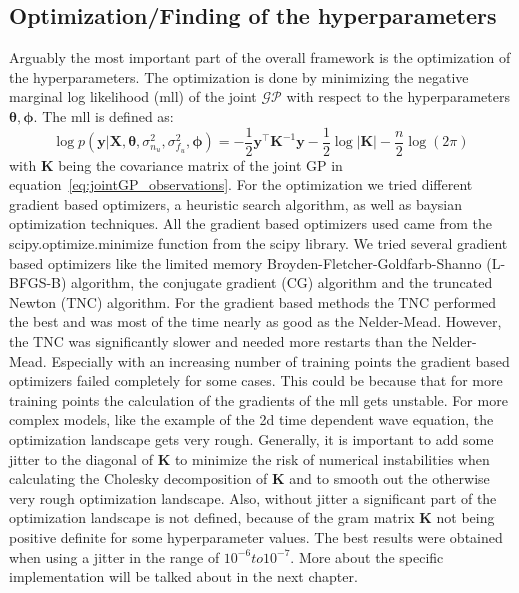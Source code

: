 \documentclass{article}
\begin{document}
\subsection{Optimization/Finding of the hyperparameters}
Arguably the most important part of the overall framework is the optimization of the hyperparameters. The optimization is done by minimizing the negative marginal log likelihood (mll) of the joint $\mathcal{GP}$ with respect to the hyperparameters $\bm{\theta, \phi}$. The mll is defined as:
\begin{equation}
    \label{eq:mll}
    \log p(\bm{y}|\bm{X},\bm{\theta},\sigma_{n_u}^2,\sigma_{f_u}^2,\bm{\phi}) =
    -\frac{1}{2}\bm{y}^\intercal \bm{K}^{-1}\bm{y} - \frac{1}{2}\log\left\lvert \bm{K}\right\rvert - \frac{n}{2}\log(2\pi)
\end{equation}
with $\bm{K}$ being the covariance matrix of the joint GP in equation~\ref{eq:jointGP_observations}. For the optimization we tried different gradient based optimizers, a heuristic search algorithm, as well as baysian optimization techniques. All the gradient based optimizers used came from the scipy.optimize.minimize function from the scipy library. We tried several gradient based optimizers like the limited memory Broyden-Fletcher-Goldfarb-Shanno (L-BFGS-B) algorithm, the conjugate gradient (CG) algorithm and the truncated Newton (TNC) algorithm. For the gradient based methods the TNC performed the best and was most of the time nearly as good as the Nelder-Mead. However, the TNC was significantly slower and needed more restarts than the Nelder-Mead. Especially with an increasing number of training points the gradient based optimizers failed completely for some cases. This could be because that for more training points the calculation of the gradients of the mll gets unstable. For more complex models, like the example of the 2d time dependent wave equation, the optimization landscape gets very rough.  Generally, it is important to add some jitter to the diagonal of $\bm{K}$ to minimize the risk of numerical instabilities when calculating the Cholesky decomposition of $\bm{K}$ and to smooth out the otherwise very rough optimization landscape. Also, without jitter a significant part of the optimization landscape is not defined, because of the  gram matrix $\bm{K}$ not being positive definite for some hyperparameter values. The best results were obtained when using a jitter in the range of $10^{-6} to 10^{-7}$. More about the specific implementation will be talked about in the next chapter.\\
\end{document}
